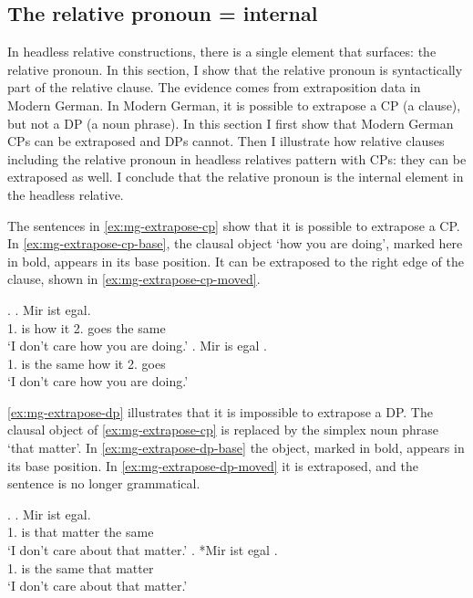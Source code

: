  \subsection{The relative pronoun = internal}\label{sec:internal-element}

 In headless relative constructions, there is a single element that surfaces: the relative pronoun. In this section, I show that the relative pronoun is syntactically part of the relative clause. The evidence comes from extraposition data in Modern German. In Modern German, it is possible to extrapose a CP (a clause), but not a DP (a noun phrase). In this section I first show that Modern German CPs can be extraposed and DPs cannot. Then I illustrate how relative clauses including the relative pronoun in headless relatives pattern with CPs: they can be extraposed as well. I conclude that the relative pronoun is the internal element in the headless relative.

 The sentences in \ref{ex:mg-extrapose-cp} show that it is possible to extrapose a CP. In \ref{ex:mg-extrapose-cp-base}, the clausal object  `how you are doing', marked here in bold, appears in its base position. It can be extraposed to the right edge of the clause, shown in \ref{ex:mg-extrapose-cp-moved}.

 \ex.\label{ex:mg-extrapose-cp}
 \ag. Mir ist     egal.\\
  1. is how it 2. goes {the same}\\
  `I don't care how you are doing.'\label{ex:mg-extrapose-cp-base}
 \bg. Mir is egal    .\\
  1. is {the same} how it 2. goes\\
  `I don't care how you are doing.' \label{ex:mg-extrapose-cp-moved}

 \ref{ex:mg-extrapose-dp} illustrates that it is impossible to extrapose a DP. The clausal object of \ref{ex:mg-extrapose-cp} is replaced by the simplex noun phrase  `that matter'.
 In \ref{ex:mg-extrapose-dp-base} the object, marked in bold, appears in its base position. In \ref{ex:mg-extrapose-dp-moved} it is extraposed, and the sentence is no longer grammatical.

 \ex.\label{ex:mg-extrapose-dp}
 \ag. Mir ist   egal.\\
  1. is that matter {the same}\\
  `I don't care about that matter.'\label{ex:mg-extrapose-dp-base}
 \bg. *Mir ist egal  .\\
  1. is {the same} that matter\\
  `I don't care about that matter.' \label{ex:mg-extrapose-dp-moved}


